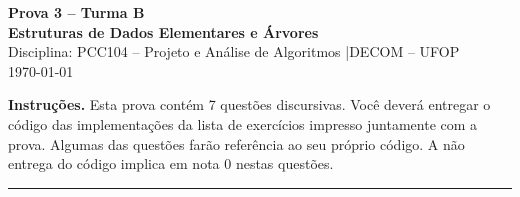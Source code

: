 \documentclass[9pt,a4paper]{extarticle}
\begin{document}
\begin{center}
  \Large \textbf{Prova 3 -- Turma B \\ Estruturas de Dados Elementares e Árvores} \\[4pt]
  \normalsize Disciplina: PCC104 -- Projeto e Análise de Algoritmos \quad|\quad DECOM -- UFOP \\[2pt]
  \normalsize \today
\end{center}

\medskip
\noindent\textbf{Instruções.} Esta prova contém 7 questões discursivas. Você deverá entregar o código das implementações da lista de exercícios impresso juntamente com a prova. Algumas das questões farão referência ao seu próprio código. A não entrega do código implica em nota 0 nestas questões.

\bigskip\hrule\bigskip
\end{document}
